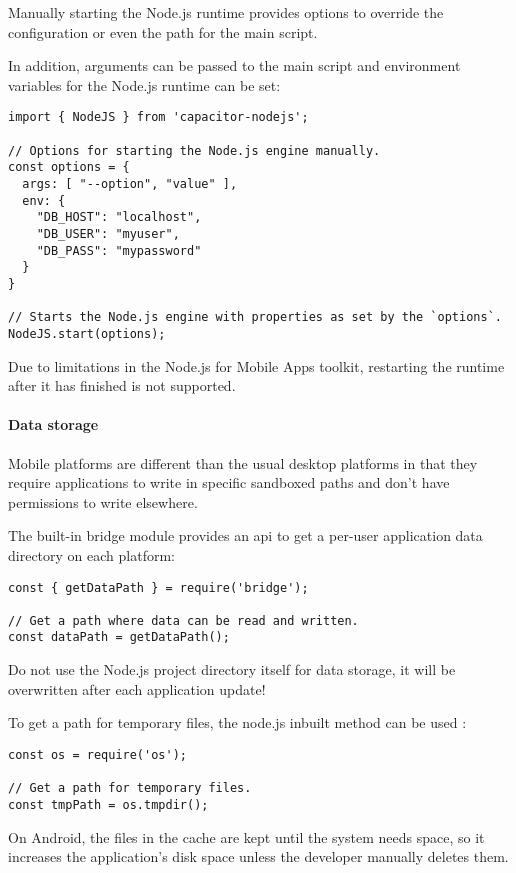 Manually starting the Node.js runtime provides options to override the  configuration or even the path for the main script.

In addition, arguments can be passed to the main script and environment variables for the Node.js runtime can be set:

\begin{verbatim}
import { NodeJS } from 'capacitor-nodejs';

// Options for starting the Node.js engine manually.
const options = {
  args: [ "--option", "value" ],
  env: {
    "DB_HOST": "localhost",
    "DB_USER": "myuser",
    "DB_PASS": "mypassword"
  }
}

// Starts the Node.js engine with properties as set by the `options`.
NodeJS.start(options);
\end{verbatim}

\begin{note}[Note]
  Due to limitations in the Node.js for Mobile Apps toolkit, restarting the runtime after it has finished is not supported.
  \cite{nodejs-mobile:docs}
\end{note}

\newpage

\paragraph{Data storage}
\label{sec:Capacitor-NodeJS:DataStorage}

Mobile platforms are different than the usual desktop platforms in that they require applications to write in specific sandboxed paths and don't have permissions to write elsewhere.
\cite{nodejs-mobile:docs}

The built-in bridge module provides an \ac{api} to get a per-user application data directory on each platform:

\begin{verbatim}
const { getDataPath } = require('bridge');

// Get a path where data can be read and written.
const dataPath = getDataPath();
\end{verbatim}

\begin{warning}[Warning]
  Do not use the Node.js project directory itself for data storage, it will be overwritten after each application update!
  \cite{nodejs-mobile:docs}
\end{warning}

To get a path for temporary files, the node.js inbuilt method  can be used \cite{nodejs}:

\begin{verbatim}
const os = require('os');

// Get a path for temporary files.
const tmpPath = os.tmpdir();
\end{verbatim}

\begin{warning}[Warning]
  On Android, the files in the cache are kept until the system needs space, so it increases the application's disk space unless the developer manually deletes them.
  \cite{nodejs-mobile:docs}
\end{warning}
